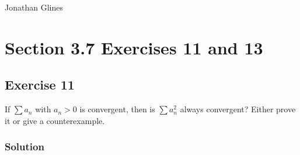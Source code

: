 \documentclass[12pt]{article}
\begin{document}
\begin{flushright}
\Large{Jonathan Glines}
\end{flushright}
\section*{Section 3.7 Exercises 11 and 13}
\subsection*{Exercise 11}
If $\sum a_n$ with $a_n > 0$ is convergent, then is $\sum a_n^2$ always convergent? Either prove it or give a counterexample.
\subsubsection*{Solution}
\end{document}
